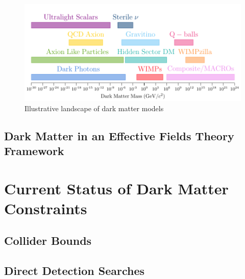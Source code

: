 \begin{figure}
    \centering
    \includegraphics{img/chapter_1/DM_model_landscape.pdf}
    \caption{Illustrative landscape of dark matter models}
    \label{fig:DM_models_landscape}
\end{figure}

\subsection{Dark Matter in an Effective Fields Theory Framework}


\section{Current Status of Dark Matter Constraints}

\subsection{Collider Bounds}

\subsection{Direct Detection Searches}

